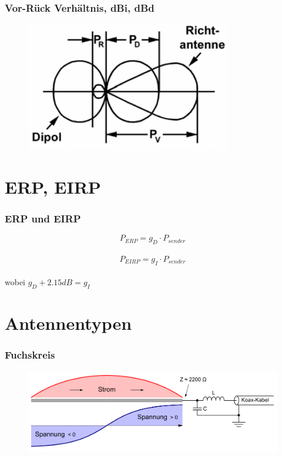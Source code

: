 \begin{frame}
  \frametitle{Vor-Rück Verhältnis, dBi, dBd}
  \begin{center}
    \begin{figure}
      \includegraphics[width=0.8\textwidth,height=.75\textheight,keepaspectratio]{a09/TH206.png}
    \end{figure}
  \end{center}
\end{frame}


\section*{ERP, EIRP}

\begin{frame}
  \frametitle{ERP und EIRP}
  \begin{center}
    \Large $$P_{ERP} = g_{D} \cdot P_{sender}$$ \\
    $$P_{EIRP} = g_{I} \cdot P_{sender}$$ \\
    wobei $g_D + 2.15dB = g_I$
  \end{center}
\end{frame}

\section*{Antennentypen}

\begin{frame}
  \frametitle{Fuchskreis}
  \begin{center}
    \begin{figure}
      \includegraphics[width=1\textwidth,height=.75\textheight,keepaspectratio]{a09/1000px-Endgespeiste_Antenne.png}
    \end{figure}
  \end{center}
\end{frame}

